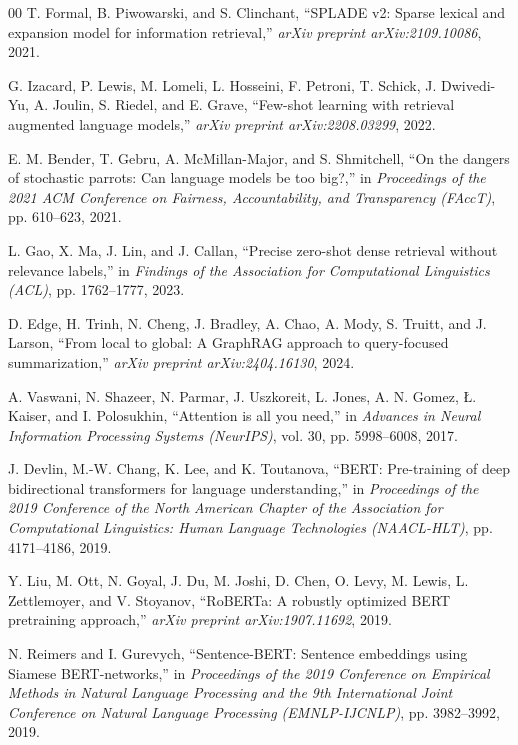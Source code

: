 \documentclass[conference]{IEEEtran}
\begin{document}
\begin{thebibliography}{00}
T. Formal, B. Piwowarski, and S. Clinchant, ``SPLADE v2: Sparse lexical and expansion model for information retrieval,'' \textit{arXiv preprint arXiv:2109.10086}, 2021.

G. Izacard, P. Lewis, M. Lomeli, L. Hosseini, F. Petroni, T. Schick, J. Dwivedi-Yu, A. Joulin, S. Riedel, and E. Grave, ``Few-shot learning with retrieval augmented language models,'' \textit{arXiv preprint arXiv:2208.03299}, 2022.

E. M. Bender, T. Gebru, A. McMillan-Major, and S. Shmitchell, ``On the dangers of stochastic parrots: Can language models be too big?,'' in \textit{Proceedings of the 2021 ACM Conference on Fairness, Accountability, and Transparency (FAccT)}, pp. 610--623, 2021.

L. Gao, X. Ma, J. Lin, and J. Callan, ``Precise zero-shot dense retrieval without relevance labels,'' in \textit{Findings of the Association for Computational Linguistics (ACL)}, pp. 1762--1777, 2023.

D. Edge, H. Trinh, N. Cheng, J. Bradley, A. Chao, A. Mody, S. Truitt, and J. Larson, ``From local to global: A GraphRAG approach to query-focused summarization,'' \textit{arXiv preprint arXiv:2404.16130}, 2024.

A. Vaswani, N. Shazeer, N. Parmar, J. Uszkoreit, L. Jones, A. N. Gomez, {\L}. Kaiser, and I. Polosukhin, ``Attention is all you need,'' in \textit{Advances in Neural Information Processing Systems (NeurIPS)}, vol. 30, pp. 5998--6008, 2017.

J. Devlin, M.-W. Chang, K. Lee, and K. Toutanova, ``BERT: Pre-training of deep bidirectional transformers for language understanding,'' in \textit{Proceedings of the 2019 Conference of the North American Chapter of the Association for Computational Linguistics: Human Language Technologies (NAACL-HLT)}, pp. 4171--4186, 2019.

Y. Liu, M. Ott, N. Goyal, J. Du, M. Joshi, D. Chen, O. Levy, M. Lewis, L. Zettlemoyer, and V. Stoyanov, ``RoBERTa: A robustly optimized BERT pretraining approach,'' \textit{arXiv preprint arXiv:1907.11692}, 2019.

N. Reimers and I. Gurevych, ``Sentence-BERT: Sentence embeddings using Siamese BERT-networks,'' in \textit{Proceedings of the 2019 Conference on Empirical Methods in Natural Language Processing and the 9th International Joint Conference on Natural Language Processing (EMNLP-IJCNLP)}, pp. 3982--3992, 2019.


\end{thebibliography}
\end{document}
